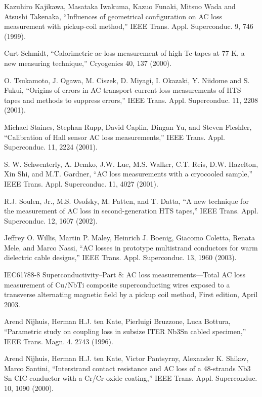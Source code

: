 \noindent [7.96] Kazuhiro Kajikawa, Masataka Iwakuma, Kazuo Funaki, Mitsuo Wada and Atsushi
Takenaka, ``Influences of geometrical configuration on AC loss measurement
with pickup-coil method,” IEEE Trans. Appl. Superconduc. 9, 746 (1999).

\noindent [7.97] Curt Schmidt, ``Calorimetric ac-loss measurement of high Tc-tapes at 77 K, a new
measuring technique,” Cryogenics 40, 137 (2000).

\noindent [7.98] O. Tsukamoto, J. Ogawa, M. Ciszek, D. Miyagi, I. Okazaki, Y. Niidome and
S. Fukui, ``Origins of errors in AC transport current loss measurements of HTS
tapes and methods to suppress errors,” IEEE Trans. Appl. Superconduc. 11, 2208
(2001).

\noindent [7.99] Michael Staines, Stephan Rupp, David Caplin, Dingan Yu, and Steven Fleshler,
``Calibration of Hall sensor AC loss measurements,” IEEE Trans. Appl. Superconduc.
11, 2224 (2001).

\noindent [7.100] S. W. Schwenterly, A. Demko, J.W. Lue, M.S. Walker, C.T. Reis, D.W. Hazelton,
Xin Shi, and M.T. Gardner, ``AC loss measurements with a cryocooled sample,”
IEEE Trans. Appl. Superconduc. 11, 4027 (2001).

\noindent [7.101] R.J. Soulen, Jr., M.S. Osofsky, M. Patten, and T. Datta, ``A new technique for
the measurement of AC loss in second-generation HTS tapes,” IEEE Trans. Appl.
Superconduc. 12, 1607 (2002).

\noindent [7.102] Jeffrey O. Willis, Martin P. Maley, Heinrich J. Boenig, Giacomo Coletta, Renata Mele, and Marco Nassi, 
``AC losses in prototype multistrand conductors for warm
dielectric cable designs,” IEEE Trans. Appl. Superconduc. 13, 1960 (2003).

\noindent [7.103] IEC61788-8 Superconductivity–Part 8: AC loss measurements—Total AC loss measurement of 
Cu/NbTi composite superconducting wires exposed to a transverse alternating magnetic field by a pickup coil method, First edition, April
2003.

\noindent [7.104] Arend Nijhuis, Herman H.J. ten Kate, Pierluigi Bruzzone, Luca Bottura, ``Parametric
study on coupling loss in subsize ITER Nb3Sn cabled specimen,” IEEE
Trans. Magn. 4. 2743 (1996).

\noindent [7.105] Arend Nijhuis, Herman H.J. ten Kate, Victor Pantsyrny, Alexander K. Shikov,
Marco Santini, ``Interstrand contact resistance and AC loss of a 48-strands Nb3
Sn CIC conductor with a Cr/Cr-oxide coating,” IEEE Trans. Appl. Superconduc.
10, 1090 (2000).

